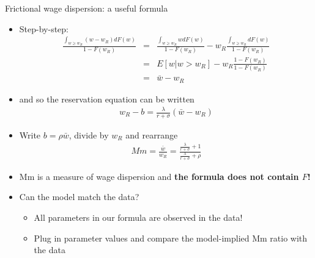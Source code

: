 \documentclass[9pt]{beamer}
\newcommand{\bit}{\begin{itemize}}
\newcommand{\eit}{\end{itemize}}
\begin{document}
\begin{frame}{Frictional wage dispersion: a useful formula}

\bit
\setlength\itemsep{1em}
\item Step-by-step:
\begin{eqnarray}
\frac{\int_{w\geq w_R} (w-w_R) dF(w)}{1-F(w_R)} &=& \frac{\int_{w\geq w_R} w dF(w)}{1-F(w_R)} - w_R \frac{\int_{w\geq w_R} dF(w)}{1-F(w_R)} \nonumber \\
&=& E [w | w > w_R] - w_R \frac{1-F(w_R)}{1-F(w_R)}\nonumber \\
&=& \bar w -w_R \nonumber
\end{eqnarray}
\item and so the reservation equation can be written
\begin{eqnarray}
w_R  - b = \frac{\lambda}{r+\sigma} (\bar w - w_R)\nonumber
\end{eqnarray}
\item Write $b = \rho \bar w$, divide by $w_R$ and rearrange
\begin{eqnarray}
Mm = \frac{\bar w}{w_R} = \frac{\frac{\lambda}{r+\sigma}+1}{\frac{\lambda}{r+\sigma}+\rho \nonumber}
\end{eqnarray}

\item Mm is a measure of wage dispersion and \bf the formula does not contain $F$! \normalfont

\item Can the model match the data?
\bit
\setlength\itemsep{0.5em}
\item All parameters in our formula are observed in the data!
\item Plug in parameter values and compare the model-implied Mm ratio with the data
\eit


\eit
\end{frame}
\end{document}
